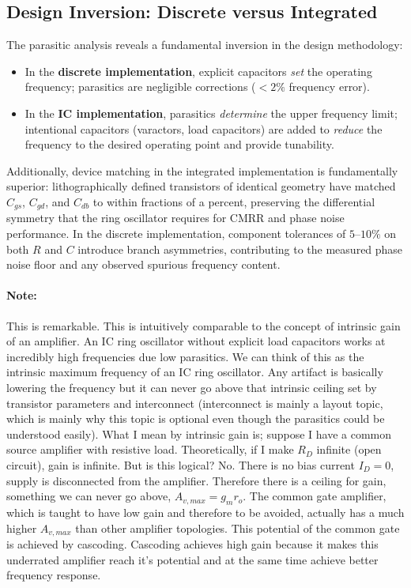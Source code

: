 \documentclass[11pt]{article}
\begin{document}
\subsection{Design Inversion: Discrete versus Integrated}
 
The parasitic analysis reveals a fundamental inversion in the design methodology:
 
\begin{itemize}
    \item In the \textbf{discrete implementation}, explicit capacitors
    \emph{set} the operating frequency; parasitics are negligible corrections
    ($< 2\%$ frequency error).
 
    \item In the \textbf{IC implementation}, parasitics \emph{determine} the
    upper frequency limit; intentional capacitors (varactors, load capacitors)
    are added to \emph{reduce} the frequency to the desired operating point and
    provide tunability.
\end{itemize}
 
Additionally, device matching in the integrated implementation is
fundamentally superior: lithographically defined transistors of identical
geometry have matched $C_{gs}$, $C_{gd}$, and $C_{db}$ to within fractions of
a percent, preserving the differential symmetry that the ring oscillator requires
for CMRR and phase noise performance. In the discrete implementation, component
tolerances of $5$--$10\%$ on both $R$ and $C$ introduce branch asymmetries,
contributing to the measured phase noise floor and any observed spurious
frequency content.

\paragraph{Note:} This is remarkable. This is intuitively comparable to the concept of intrinsic gain of an amplifier. An IC ring oscillator without explicit load capacitors works at incredibly high frequencies due low parasitics. We can think of this as the intrinsic maximum frequency of an IC ring oscillator. Any artifact is basically lowering the frequency but it can never go above that intrinsic ceiling set by transistor parameters and interconnect (interconnect is mainly a layout topic, which is mainly why this topic is optional even though the parasitics could be understood easily). What I mean by intrinsic gain is; suppose I have a common source amplifier with resistive load. Theoretically, if I make $R_D$ infinite (open circuit), gain is infinite. But is this logical? No. There is no bias current $I_D = 0$, supply is disconnected from the amplifier. Therefore there is a ceiling for gain, something we can never go above, $A_{v,max} = g_mr_o$. The common gate amplifier, which is taught to have low gain and therefore to be avoided, actually has a much higher $A_{v,max}$ than other amplifier topologies. This potential of the common gate is achieved by cascoding. Cascoding achieves high gain because it makes this underrated amplifier reach it's potential and at the same time achieve better frequency response.
\end{document}
